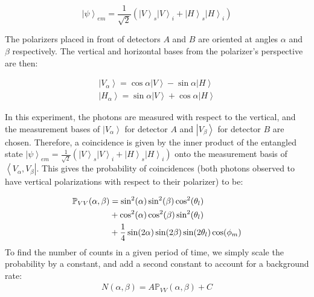 \documentclass[letter,scriptaddress,twocolumn, prl, nofootinbib]{revtex4}
\newcommand{\ket}[1]{\left| #1 \right\rangle}
\newcommand{\bra}[1]{\left\langle #1 \right|}
\begin{document}
\begin{equation}\label{eq:balentstate}
    \ket{\psi}_{em} = \frac{1}{\sqrt{2}} \left( \ket{V}_s\ket{V}_i+\ket{H}_s\ket{H}_i\right)
\end{equation}

The polarizers placed in front of detectors $A$ and $B$ are oriented at angles $\alpha$ and $\beta$ respectively. The vertical and horizontal bases from the polarizer's perspective are then:

\begin{align}
    \label{eq:rotated_bases}
    \ket{V_\alpha} = \cos{\alpha}\ket{V}-\sin{\alpha}\ket{H} \\
    \ket{H_\alpha} = \sin{\alpha}\ket{V}+\cos{\alpha}\ket{H}
\end{align}



In this experiment, the photons are measured with respect to the vertical, and the measurement bases of $\ket{V_\alpha}$ for detector $A$ and $\ket{V_\beta}$ for detector $B$ are chosen. Therefore, a coincidence is given by the inner product of the entangled state $\ket{\psi}_{em} = \frac{1}{\sqrt{2}} \left( \ket{V}_s\ket{V}_i+\ket{H}_s\ket{H}_i\right)$ onto the measurement basis of $\bra{V_\alpha, V_\beta}$. This gives the probability of coincidences (both photons observed to have vertical polarizations with respect to their polarizer) to be: 

\begin{align}
\label{eq:prob_expression}
    \mathbb{P}_{VV}(\alpha, \beta) &= \sin^2(\alpha)\sin^2(\beta)\cos^2(\theta_l) \notag \\ &+\cos^2(\alpha) \cos^2(\beta)\sin^2(\theta_l) \notag \\ &+ \frac{1}{4} \sin(2\alpha)\sin(2\beta)\sin(2 \theta_l)\cos(\phi_m)
\end{align}
To find the number of counts in a given period of time, we simply scale the probability by a constant, and add a second constant to account for a background rate:
\begin{align}
N(\alpha, \beta)=A\mathbb{P}_{VV}(\alpha, \beta) + C
\end{align}
\end{document}
